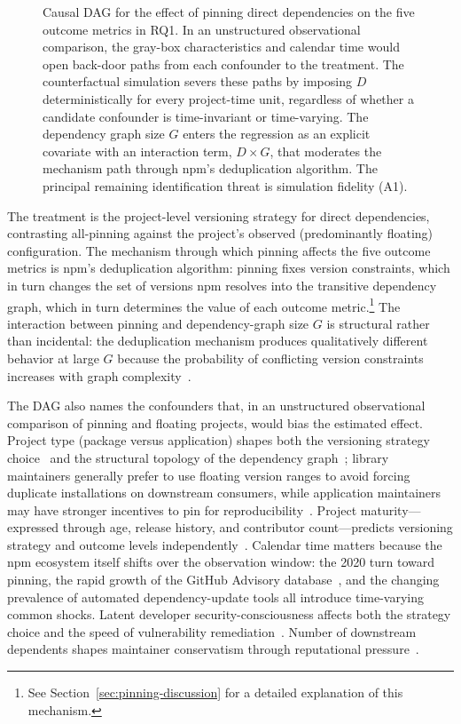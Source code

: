 \begin{figure}[t]
    \caption{Causal DAG for the effect of pinning direct dependencies on the five outcome metrics in RQ1.
    In an unstructured observational comparison, the gray-box characteristics and calendar time would open back-door paths from each confounder to the treatment.
    The counterfactual simulation severs these paths by imposing $D$ deterministically for every project-time unit, regardless of whether a candidate confounder is time-invariant or time-varying.
    The dependency graph size $G$ enters the regression as an explicit covariate with an interaction term, $D \times G$, that moderates the mechanism path through npm's deduplication algorithm.
    The principal remaining identification threat is simulation fidelity (A1).}
    \label{fig:dag-pinning}
\end{figure}

The treatment is the project-level versioning strategy for direct dependencies, contrasting all-pinning against the project's observed (predominantly floating) configuration.
The mechanism through which pinning affects the five outcome metrics is npm's deduplication algorithm: pinning fixes version constraints, which in turn changes the set of versions npm resolves into the transitive dependency graph, which in turn determines the value of each outcome metric.\footnote{See Section~\ref{sec:pinning-discussion} for a detailed explanation of this mechanism.}
The interaction between pinning and dependency-graph size $G$ is structural rather than incidental: the deduplication mechanism produces qualitatively different behavior at large $G$ because the probability of conflicting version constraints increases with graph complexity~\cite{DBLP:conf/icse/PinckneyCGBCG23}.

The DAG also names the confounders that, in an unstructured observational comparison of pinning and floating projects, would bias the estimated effect.
Project type (package versus application) shapes both the versioning strategy choice~\cite{DBLP:journals/tse/JafariCAST22} and the structural topology of the dependency graph~\cite{DBLP:conf/kbse/LatendresseMCS22, DBLP:journals/ese/DecanMG19}; library maintainers generally prefer to use floating version ranges to avoid forcing duplicate installations on downstream consumers, while application maintainers may have stronger incentives to pin for reproducibility~\cite{DBLP:journals/corr/abs-2505-04834, renovate-pinning}.
Project maturity---expressed through age, release history, and contributor count---predicts versioning strategy and outcome levels independently~\cite{DBLP:journals/tosem/JafariCSA23, DBLP:conf/icsr/ZeroualiCMRG18}.
Calendar time matters because the npm ecosystem itself shifts over the observation window: the 2020 turn toward pinning, the rapid growth of the GitHub Advisory database~\cite{DBLP:journals/ese/ChinthanetKMIIM21}, and the changing prevalence of automated dependency-update tools all introduce time-varying common shocks.
Latent developer security-consciousness affects both the strategy choice and the speed of vulnerability remediation~\cite{DBLP:conf/ccs/PashchenkoVM20}.
Number of downstream dependents shapes maintainer conservatism through reputational pressure~\cite{DBLP:conf/uss/ZimmermannSTP19}.

